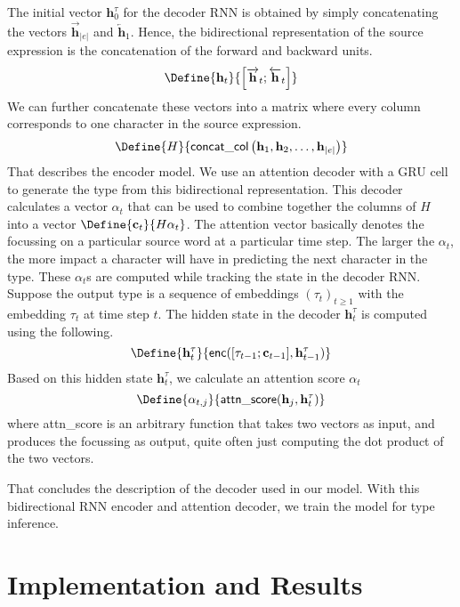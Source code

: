\documentclass[twocolumn,9pt]{article}
\theoremstyle{definition}
\theoremstyle{remark}
\numberwithin{equation}{section}
\newcommand\Abs[1]{\left\vert{#1}\right\vert}
\newcommand\Squares[1]{\left[#1\right]}
\newcommand{\Ht}[1]{\mathbf{h}_{#1}}
\newcommand{\Htf}[1]{\overrightarrow{\mathbf{h}}_{#1}}
\newcommand{\Htb}[1]{\overleftarrow{\mathbf{h}}_{#1}}
\newcommand{\Htd}[1]{\mathbf{h}^{\tau}_{#1}}
\newcommand{\Al}[1]{\alpha_{#1}}
\begin{document}
The initial vector $\Htd{0}$ for the decoder RNN is obtained by simply
concatenating the vectors $\Htf{\Abs{e}}$ and $\Htb{1}$. Hence, the
bidirectional representation of the source expression is the
concatenation of the forward and backward units.
\[
  \Define{
    \Ht{t}
  }{
    \Squares{\Htf{t} ; \Htb{t}}
  }
\]
We can further concatenate these vectors into a matrix where every
column corresponds to one character in the source expression.
\[
  \Define{H}{
    \mathsf{concat\_col}\left(\Ht{1}, \Ht{2}, \ldots, \Ht{\Abs{e}}\right)
  }
\]
That describes the encoder model. We use an attention decoder
with a GRU cell to generate
the type from this bidirectional representation. This decoder calculates
a vector $\Al{t}$ that can be used to combine together the columns of $H$
into a vector $\Define{\mathbf{c}_t}{H \Al{t}}$. The attention vector basically denotes
the focussing on a particular source word at a particular time step. The larger
the $\Al{t}$, the more impact a character will have in predicting the next
character in the type. These $\Al{t}$s are computed while tracking the state
in the decoder RNN. Suppose the output type is a sequence of embeddings
${(\tau_t)}_{t \geq 1}$ with the embedding $\tau_t$ at time step $t$.
The hidden state in the decoder $\Htd{t}$ is computed
using the following.
\[
\Define{\Htd{t}}{\mathsf{enc}([\tau_{t-1} ; \mathbf{c}_{t-1}], \Htd{t-1})}
\]
Based on this hidden state $\Htd{t}$, we calculate an attention score $\Al{t}$
\[
\Define{\Al{t, j}}{\mathsf{attn\_score}(\Ht{j}, \Htd{t})}
\]
where attn\_score is an arbitrary function that takes two vectors as input,
and produces the focussing as output, quite often just computing the dot
product of the two vectors.

That concludes the description of the decoder used in our model. With this
bidirectional RNN encoder and attention decoder, we train the model for
type inference.

\section{Implementation and Results}



\end{document}
